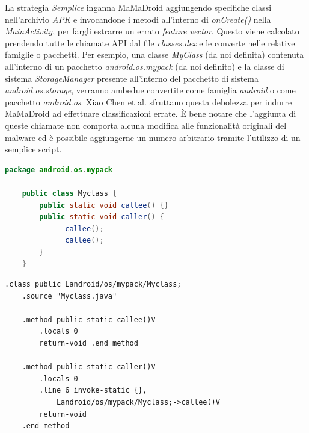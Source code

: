 La strategia \textit{Semplice} inganna MaMaDroid aggiungendo specifiche classi nell'archivio \textit{APK} e invocandone i metodi all'interno di \textit{onCreate()} nella \textit{MainActivity}, per fargli estrarre un errato \textit{feature vector}. Questo viene calcolato prendendo tutte le chiamate API dal file \textit{classes.dex} e le converte nelle relative famiglie o pacchetti. Per esempio, una classe \textit{MyClass} (da noi definita) contenuta all'interno di un pacchetto \textit{android.os.mypack} (da noi definito) e la classe di sistema \textit{StorageManager} presente all'interno del pacchetto di sistema \textit{android.os.storage}, verranno ambedue convertite come famiglia \textit{android} o come pacchetto \textit{android.os}. Xiao Chen et al. sfruttano questa debolezza per indurre MaMaDroid ad effettuare classificazioni errate. È bene notare che l'aggiunta di queste chiamate non comporta alcuna modifica alle funzionalità originali del malware ed è possibile aggiungerne un numero arbitrario tramite l'utilizzo di un semplice script.\\

\begin{lstlisting}[language=Java, label={lst:label}, caption=Esempio di classe ideata da Xiao Chen et al.\cite{hiv} per sfruttare la debolezza del calcolo del \textit{feature vector} di MaMaDroid]
    package android.os.mypack
    
    public class Myclass {
        public static void callee() {} 
        public static void caller() {
              callee();
              callee();
        }
    }
\end{lstlisting}

\begin{lstlisting}[caption=Equivalente del codice di \textit{Listing \ref{lst:label}} in smail]
    .class public Landroid/os/mypack/Myclass; 
    .source "Myclass.java"
    
    .method public static callee()V 
        .locals 0
        return-void .end method

    .method public static caller()V 
        .locals 0
        .line 6 invoke-static {},
            Landroid/os/mypack/Myclass;->callee()V 
        return-void
    .end method
\end{lstlisting}
\ \\

\pagebreak

